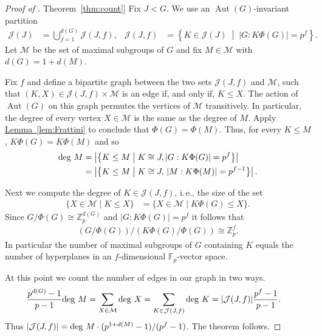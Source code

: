 \documentclass[11pt]{article}
\numberwithin{equation}{section}
\theoremstyle{definition}
\theoremstyle{plain}
\newcommand{\ie}{i.\,e.}
\newcommand{\expref}[2]{\hyperref[#2]{#1~\ref{#2}}}
\numberwithin{equation}{section}
\theoremstyle{plain}       %
\theoremstyle{remark}
\theoremstyle{definition}
\numberwithin{figure}{section}
\numberwithin{table}{section}
\newcommand{\bbF}{\mathbb{F}}  %
\DeclareMathOperator{\Aut}{Aut}  %
\begin{document}
\begin{proof}[Proof of \expref{Theorem}{thm:count}]
Fix $J<G$.  We use an $\Aut(G)$-invariant partition
\begin{align*}
	\mathcal{J}(J) & = \bigcup_{f=1}^{d(G)} \mathcal{J}(J,f),
&	\mathcal{J}(J,f) & = 
		\left\{K \in \mathcal{J}(J) \;\middle|\; |G:K\Phi(G)|=p^f\right\}.
\end{align*}
Let $\mathcal{M}$ be the set of maximal subgroups of $G$ and fix $M\in \mathcal{M}$ with $d(G)=1+d(M)$.

%
Fix $f$ and define a bipartite graph between the two sets $\mathcal{J}(J,f)$ and
$\mathcal{M}$, such that $(K,X)\in \mathcal{J}(J,f)\times \mathcal{M}$ is an
edge if, and only if, $K\leq X$.  The action of $\Aut(G)$ on this graph permutes
the vertices of $\mathcal{M}$ transitively.  In particular, the degree of every
vertex $X\in \mathcal{M}$  is the same as the degree of $M$.  Apply
\expref{Lemma}{lem:Frattini} to conclude that $\Phi(G)=\Phi(M)$.  Thus, for every
$K\leq M$, $K\Phi(G)=K\Phi(M)$ and so
\begin{align*}
	{\rm deg}~M & = \left|\left\{ 
			K\leq M \;\middle|\; K\cong J, |G:K\Phi(G)|=p^f 
	\right\}\right|\\
		& = \left|\left\{ K\leq M \;\middle|\; 
		K\cong J,\, |M:K\Phi(M)|=p^{f-1} \right\}\right|.
\end{align*}

Next we compute the degree of $K\in \mathcal{J}(J,f)$, \ie, the
size of the set
\begin{align*}
	\{ X\in \mathcal{M} \mid K\leq X\}
		& = 	\{ X\in \mathcal{M} \mid K\Phi(G)\leq X\}.
\end{align*}
Since $G/\Phi(G)\cong \mathbb{Z}_p^{d(G)}$ and $|G:K\Phi(G)|=p^f$
it follows that
\begin{align*}
	 (G/\Phi(G))/(K\Phi(G)/\Phi(G))\cong 
		\mathbb{Z}_p^{f}.
\end{align*}
In particular the number of maximal subgroups of $G$ containing $K$ equals the number of hyperplanes in an $f$-dimensional $\bbF_p$-vector space.  

At this point we count the number of edges in our graph in two ways.
\begin{align*}
	\frac{p^{d(G)}-1}{p-1}{\rm deg}~M & = 
		\sum_{X\in \mathcal{M}} {\rm deg}~X
		 =	\sum_{K\in \mathcal{J}(J,f)} {\rm deg}~K
		 = |\mathcal{J}(J,f)|\frac{p^{f}-1}{p-1}.
\end{align*}
Thus $|\mathcal{J}(J,f)|= {\rm deg}~M\cdot(p^{1+d(M)}-1)/(p^{f}-1)$.  The theorem follows.
\end{proof}
\end{document}
